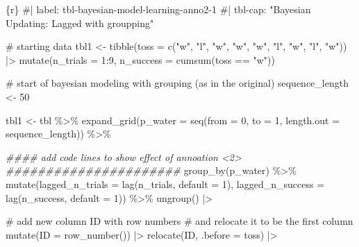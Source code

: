 \documentclass[
  letterpaper,
  DIV=11,
  numbers=noendperiod]{scrreprt}
\newenvironment{Shaded}{\begin{snugshade}}{\end{snugshade}}
\newcommand{\AttributeTok}[1]{\textcolor[rgb]{0.40,0.45,0.13}{#1}}
\newcommand{\CommentTok}[1]{\textcolor[rgb]{0.37,0.37,0.37}{#1}}
\newcommand{\DecValTok}[1]{\textcolor[rgb]{0.68,0.00,0.00}{#1}}
\newcommand{\DocumentationTok}[1]{\textcolor[rgb]{0.37,0.37,0.37}{\textit{#1}}}
\newcommand{\FunctionTok}[1]{\textcolor[rgb]{0.28,0.35,0.67}{#1}}
\newcommand{\InformationTok}[1]{\textcolor[rgb]{0.37,0.37,0.37}{#1}}
\newcommand{\NormalTok}[1]{\textcolor[rgb]{0.00,0.23,0.31}{#1}}
\newcommand{\OtherTok}[1]{\textcolor[rgb]{0.00,0.23,0.31}{#1}}
\newcommand{\SpecialCharTok}[1]{\textcolor[rgb]{0.37,0.37,0.37}{#1}}
\newcommand{\StringTok}[1]{\textcolor[rgb]{0.13,0.47,0.30}{#1}}
\begin{document}
\begin{Shaded}
\begin{Highlighting}[]
\InformationTok{\textasciigrave{}\textasciigrave{}\textasciigrave{}\{r\}}
\CommentTok{\#| label: tbl{-}bayesian{-}model{-}learning{-}anno2{-}1}
\CommentTok{\#| tbl{-}cap: "Bayesian Updating: Lagged with groupping"}

\CommentTok{\# starting data}
\NormalTok{tbl1 }\OtherTok{\textless{}{-}} \FunctionTok{tibble}\NormalTok{(}\AttributeTok{toss =} \FunctionTok{c}\NormalTok{(}\StringTok{"w"}\NormalTok{, }\StringTok{"l"}\NormalTok{, }\StringTok{"w"}\NormalTok{, }\StringTok{"w"}\NormalTok{, }\StringTok{"w"}\NormalTok{, }\StringTok{"l"}\NormalTok{, }\StringTok{"w"}\NormalTok{, }\StringTok{"l"}\NormalTok{, }\StringTok{"w"}\NormalTok{)) }\SpecialCharTok{|\textgreater{}}
    \FunctionTok{mutate}\NormalTok{(}\AttributeTok{n\_trials  =} \DecValTok{1}\SpecialCharTok{:}\DecValTok{9}\NormalTok{, }\AttributeTok{n\_success =} \FunctionTok{cumsum}\NormalTok{(toss }\SpecialCharTok{==} \StringTok{"w"}\NormalTok{))}

\CommentTok{\# start of bayesian modeling with grouping (as in the original)}
\NormalTok{sequence\_length }\OtherTok{\textless{}{-}} \DecValTok{50}

\NormalTok{tbl1 }\OtherTok{\textless{}{-}}\NormalTok{ tbl }\SpecialCharTok{\%\textgreater{}\%} 
  \FunctionTok{expand\_grid}\NormalTok{(}\AttributeTok{p\_water =} \FunctionTok{seq}\NormalTok{(}\AttributeTok{from =} \DecValTok{0}\NormalTok{, }\AttributeTok{to =} \DecValTok{1}\NormalTok{, }
                            \AttributeTok{length.out =}\NormalTok{ sequence\_length)) }\SpecialCharTok{\%\textgreater{}\%} 
    
  \DocumentationTok{\#\#\#\# add code lines to show effect of annoation \textless{}2\textgreater{} \#\#\#\#\#\#\#\#\#\#\#\#\#\#\#\#\#\#\#\#\#\#}
  \FunctionTok{group\_by}\NormalTok{(p\_water) }\SpecialCharTok{\%\textgreater{}\%} 
  \FunctionTok{mutate}\NormalTok{(}\AttributeTok{lagged\_n\_trials  =} \FunctionTok{lag}\NormalTok{(n\_trials, }\AttributeTok{default =} \DecValTok{1}\NormalTok{),}
         \AttributeTok{lagged\_n\_success =} \FunctionTok{lag}\NormalTok{(n\_success, }\AttributeTok{default =} \DecValTok{1}\NormalTok{)) }\SpecialCharTok{\%\textgreater{}\%} 
  \FunctionTok{ungroup}\NormalTok{() }\SpecialCharTok{|\textgreater{}} 
    

  \CommentTok{\# add new column ID with row numbers }
  \CommentTok{\# and relocate it to be the first column}
  \FunctionTok{mutate}\NormalTok{(}\AttributeTok{ID =} \FunctionTok{row\_number}\NormalTok{()) }\SpecialCharTok{|\textgreater{}} 
  \FunctionTok{relocate}\NormalTok{(ID, }\AttributeTok{.before =}\NormalTok{ toss) }\SpecialCharTok{|\textgreater{}} 


\end{Highlighting}
\end{Shaded}
\end{document}
